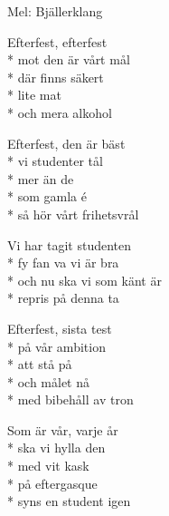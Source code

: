 \begin{SongText}[Efterfest]
\begin{SongInfo}
    Mel: Bjällerklang
\end{SongInfo}
\begin{SongVerse}
Efterfest, efterfest\\*%
mot den är vårt mål\\*%
där finns säkert\\*%
lite mat\\*%
och mera alkohol
\end{SongVerse}
\begin{SongVerse}
Efterfest, den är bäst\\*%
vi studenter tål\\*%
mer än de\\*%
som gamla é\\*%
så hör vårt frihetsvrål
\end{SongVerse}
\begin{SongVerse}
Vi har tagit studenten\\*%
fy fan va vi är bra\\*%
och nu ska vi som känt är\\*%
repris på denna ta
\end{SongVerse}
\begin{SongVerse}
Efterfest, sista test\\*%
på vår ambition\\*%
att stå på\\*%
och målet nå\\*%
med bibehåll av tron
\end{SongVerse}
\begin{SongVerse}
Som är vår, varje år\\*%
ska vi hylla den\\*%
med vit kask\\*%
på eftergasque\\*%
syns en student igen
\end{SongVerse}
\end{SongText}
\newpage